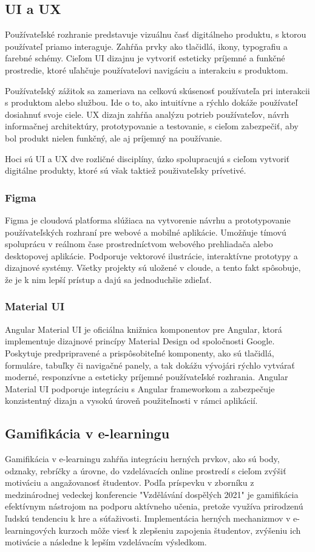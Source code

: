 \subsection{UI a UX}
Používateľské rozhranie predstavuje vizuálnu časť digitálneho produktu, s ktorou používateľ priamo interaguje. 
Zahŕňa prvky ako tlačidlá, ikony, typografiu a farebné schémy. 
Cieľom UI dizajnu je vytvoriť esteticky príjemné a funkčné prostredie, ktoré uľahčuje používateľovi navigáciu a interakciu s produktom.

Používateľský zážitok sa zameriava na celkovú skúsenosť používateľa pri interakcii s produktom alebo službou. 
Ide o to, ako intuitívne a rýchlo dokáže používateľ dosiahnuť svoje ciele. 
UX dizajn zahŕňa analýzu potrieb používateľov, návrh informačnej architektúry, prototypovanie a testovanie, s cieľom zabezpečiť, aby bol produkt nielen funkčný, ale aj príjemný na používanie.

Hoci sú UI a UX dve rozličné disciplíny, úzko spolupracujú s cieľom vytvoriť digitálne produkty, ktoré sú však taktiež použivateľsky prívetivé.\cite{uiux}
\subsubsection*{Figma}
Figma je cloudová platforma slúžiaca na vytvorenie návrhu a prototypovanie používateľských rozhraní pre webové a mobilné aplikácie. 
Umožňuje tímovú spoluprácu v reálnom čase prostredníctvom webového prehliadača alebo desktopovej aplikácie. Podporuje vektorové ilustrácie, interaktívne prototypy a dizajnové systémy.
 Všetky projekty sú uložené v cloude, a tento fakt spôsobuje, že je k nim lepší prístup a dajú sa jednoduchšie zdieľať. \cite{figma}
 \subsubsection*{Material UI}
 Angular Material UI je oficiálna knižnica komponentov pre Angular, ktorá implementuje dizajnové princípy Material Design od spoločnosti Google. 
 Poskytuje predpripravené a prispôsobiteľné komponenty, ako sú tlačidlá, formuláre, tabuľky či navigačné panely, a tak dokážu vývojári rýchlo vytvárať moderné, responzívne a esteticky príjemné používateľské rozhrania.
  Angular Material UI podporuje integráciu s Angular frameworkom a zabezpečuje konzistentný dizajn a vysokú úroveň použiteľnosti v rámci aplikácií. \cite{materialUI}

\subsection{Gamifikácia v e-learningu}
Gamifikácia v e-learningu zahŕňa integráciu herných prvkov, ako sú body, odznaky, rebríčky a úrovne, do vzdelávacích online prostredí s cieľom zvýšiť motiváciu a angažovanosť študentov.
 Podľa príspevku v zborníku z medzinárodnej vedeckej konferencie "Vzdělávání dospělých 2021" \cite{gamifikacia} je gamifikácia efektívnym nástrojom na podporu aktívneho učenia, pretože využíva prirodzenú ľudskú tendenciu k hre a súťaživosti.
  Implementácia herných mechanizmov v e-learningových kurzoch môže viesť k zlepšeniu zapojenia študentov, zvýšeniu ich motivácie a následne k lepším vzdelávacím výsledkom.

